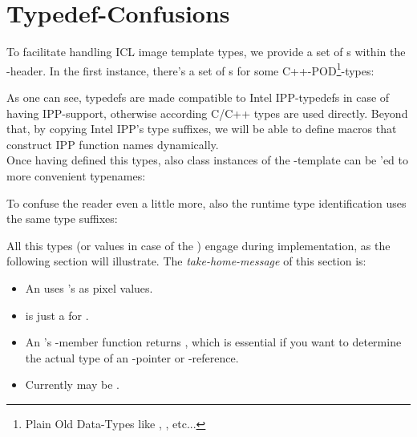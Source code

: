 

\section{Typedef-Confusions}
To facilitate handling ICL image template types, we provide a set of s within the -header. In the first instance, there's a set of s for some C++-POD\footnote{Plain Old Data-Types like , ,  etc...}-types:


As one can see, typedefs are made compatible to Intel IPP-typedefs in case of having IPP-support, otherwise according C/C++ types are used directly. Beyond that, by copying Intel IPP's type suffixes, we will be able to define macros that construct IPP function names dynamically.\\ Once having defined this types, also class instances of the -template can be 'ed to more convenient typenames:


To confuse the reader even a little more, also the runtime type identification  uses the same type suffixes:


All this types (or values in case of the ) engage during implementation, as the following section will illustrate. The \emph{take-home-message} of this section is:\\
\begin{itemize}
\item An  uses 's as pixel values.
\item {} is just a  for .
\item An 's -member function returns , which is essential if you want to determine the actual type of an -pointer or -reference.
\item Currently  may be .
\end{itemize}


